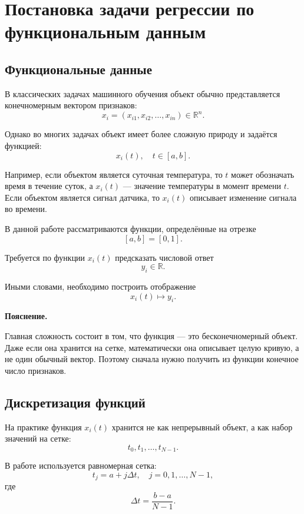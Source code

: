 \documentclass[14pt,a4paper]{extarticle}
\newenvironment{explanation}
{
    \vspace{0.2cm}
    \noindent\textbf{Пояснение.}
}
{
    \vspace{0.2cm}
}
\begin{document}
\newpage


\section{Постановка задачи регрессии по функциональным данным}

\subsection{Функциональные данные}

В классических задачах машинного обучения объект обычно представляется конечномерным вектором признаков:
\[
x_i = (x_{i1}, x_{i2}, \dots, x_{in}) \in \mathbb{R}^n.
\]

Однако во многих задачах объект имеет более сложную природу и задаётся функцией:
\[
x_i(t), \quad t \in [a,b].
\]

Например, если объектом является суточная температура, то \(t\) может обозначать время в течение суток, а \(x_i(t)\) — значение температуры в момент времени \(t\). Если объектом является сигнал датчика, то \(x_i(t)\) описывает изменение сигнала во времени.

В данной работе рассматриваются функции, определённые на отрезке
\[
[a,b]=[0,1].
\]

Требуется по функции \(x_i(t)\) предсказать числовой ответ
\[
y_i \in \mathbb{R}.
\]

Иными словами, необходимо построить отображение
\[
x_i(t) \mapsto y_i.
\]

\begin{explanation}
Главная сложность состоит в том, что функция — это бесконечномерный объект. Даже если она хранится на сетке, математически она описывает целую кривую, а не один обычный вектор. Поэтому сначала нужно получить из функции конечное число признаков.
\end{explanation}

\subsection{Дискретизация функций}

На практике функция \(x_i(t)\) хранится не как непрерывный объект, а как набор значений на сетке:
\[
t_0,t_1,\dots,t_{N-1}.
\]

В работе используется равномерная сетка:
\[
t_j = a + j\Delta t,\quad j=0,1,\dots,N-1,
\]
где
\[
\Delta t = \frac{b-a}{N-1}.
\]
\end{document}
